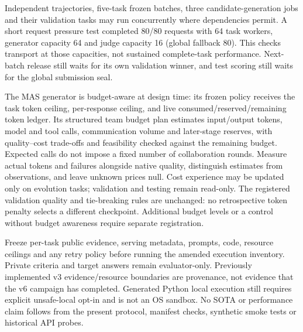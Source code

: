 Independent trajectories, five-task frozen batches, three candidate-generation
jobs and their validation tasks may run concurrently where dependencies
permit. A short request pressure test completed 80/80 requests with 64 task
workers, generator capacity 64 and judge capacity 16 (global fallback 80).
This checks transport at those capacities, not sustained complete-task
performance. Next-batch release still waits for its own validation winner,
and test scoring still waits for the global submission seal.

The MAS generator is budget-aware at design time: its frozen policy receives
the task token ceiling, per-response ceiling, and live consumed/reserved/remaining
token ledger. Its structured team budget plan estimates input/output tokens,
model and tool calls, communication volume and later-stage reserves, with
quality--cost trade-offs and feasibility checked against the remaining budget.
Expected calls do not impose a fixed number of collaboration rounds. Measure
actual tokens and failures alongside native quality, distinguish estimates from
observations, and leave unknown prices null. Cost experience may be updated
only on evolution tasks; validation and testing remain read-only. The registered
validation quality and tie-breaking rules are unchanged: no retrospective token
penalty selects a different checkpoint. Additional budget levels or a control
without budget awareness require separate registration.

Freeze per-task public evidence, serving metadata, prompts, code, resource
ceilings and any retry policy before running the amended execution
inventory. Private criteria and target answers remain evaluator-only.
Previously implemented v3 evidence/resource boundaries are provenance,
not evidence that the v6 campaign has completed. Generated
Python local execution still requires explicit unsafe-local opt-in and is
not an OS sandbox. No SOTA or performance claim follows from the present
protocol, manifest checks, synthetic smoke tests or historical API probes.
